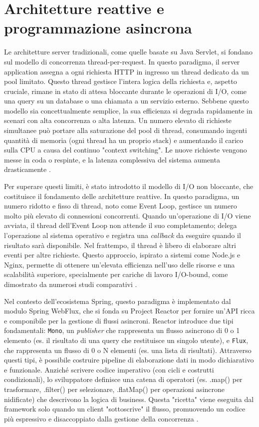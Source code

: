 \documentclass[12pt,a4paper,openright,twoside]{book}
\begin{document}
\section{Architetture reattive e programmazione asincrona}

Le architetture server tradizionali, come quelle basate su Java Servlet, si fondano sul modello di concorrenza thread-per-request. In questo paradigma, il server application assegna a ogni richiesta HTTP in ingresso un thread dedicato da un pool limitato. Questo thread gestisce l'intera logica della richiesta e, aspetto cruciale, rimane in stato di attesa bloccante durante le operazioni di I/O, come una query su un database o una chiamata a un servizio esterno. Sebbene questo modello sia concettualmente semplice, la sua efficienza si degrada rapidamente in scenari con alta concorrenza o alta latenza. Un numero elevato di richieste simultanee può portare alla saturazione del pool di thread, consumando ingenti quantità di memoria (ogni thread ha un proprio stack) e aumentando il carico sulla CPU a causa del continuo "context switching". Le nuove richieste vengono messe in coda o respinte, e la latenza complessiva del sistema aumenta drasticamente \cite{vrincean2021optimizing}.

Per superare questi limiti, è stato introdotto il modello di I/O non bloccante, che costituisce il fondamento delle architetture reattive. In questo paradigma, un numero ridotto e fisso di thread, noto come Event Loop, gestisce un numero molto più elevato di connessioni concorrenti. Quando un'operazione di I/O viene avviata, il thread dell'Event Loop non attende il suo completamento; delega l'operazione al sistema operativo e registra una \textit{callback} da eseguire quando il risultato sarà disponibile. Nel frattempo, il thread è libero di elaborare altri eventi per altre richieste. Questo approccio, ispirato a sistemi come Node.js e Nginx, permette di ottenere un'elevata efficienza nell'uso delle risorse e una scalabilità superiore, specialmente per cariche di lavoro I/O-bound, come dimostrato da numerosi studi comparativi \cite{bth2015performance, derezinska2020performance}.

Nel contesto dell'ecosistema Spring, questo paradigma è implementato dal modulo Spring WebFlux, che si fonda su Project Reactor per fornire un'API ricca e componibile per la gestione di flussi asincroni. Reactor introduce due tipi fondamentali: \texttt{Mono}, un \textit{publisher} che rappresenta un flusso asincrono di 0 o 1 elemento (es. il risultato di una query che restituisce un singolo utente), e \texttt{Flux}, che rappresenta un flusso di 0 o N elementi (es. una lista di risultati). Attraverso questi tipi, è possibile costruire pipeline di elaborazione dati in modo dichiarativo e funzionale. Anziché scrivere codice imperativo (con cicli e costrutti condizionali), lo sviluppatore definisce una catena di operatori (es. .map() per trasformare, .filter() per selezionare, .flatMap() per operazioni asincrone nidificate) che descrivono la logica di business. Questa "ricetta" viene eseguita dal framework solo quando un client "sottoscrive" il flusso, promuovendo un codice più espressivo e disaccoppiato dalla gestione della concorrenza \cite{spring_reactive}.
\end{document}
